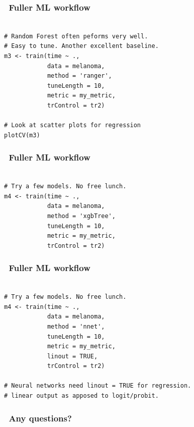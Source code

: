 \documentclass[handout, aspectratio = 169]{beamer}
\begin{document}
\begin{frame}[fragile]
\frametitle{\insertframenumber~Fuller ML workflow}
\begin{Verbatim}

# Random Forest often peforms very well.
# Easy to tune. Another excellent baseline.
m3 <- train(time ~ ., 
            data = melanoma,
            method = 'ranger',
            tuneLength = 10,
            metric = my_metric,
            trControl = tr2)

# Look at scatter plots for regression
plotCV(m3)
\end{Verbatim}

\end{frame} 


\begin{frame}[fragile]
\frametitle{\insertframenumber~Fuller ML workflow}
\begin{Verbatim}

# Try a few models. No free lunch.
m4 <- train(time ~ ., 
            data = melanoma,
            method = 'xgbTree',
            tuneLength = 10,
            metric = my_metric,
            trControl = tr2)

\end{Verbatim}

\end{frame} 


\begin{frame}[fragile]
\frametitle{\insertframenumber~Fuller ML workflow}
\begin{Verbatim}

# Try a few models. No free lunch.
m4 <- train(time ~ ., 
            data = melanoma,
            method = 'nnet',
            tuneLength = 10,
            metric = my_metric,
            linout = TRUE,
            trControl = tr2)

# Neural networks need linout = TRUE for regression.
# linear output as apposed to logit/probit.

\end{Verbatim}

\end{frame} 



\begin{frame}
\frametitle{\insertframenumber~Any questions?}


\end{frame} 
\end{document}
